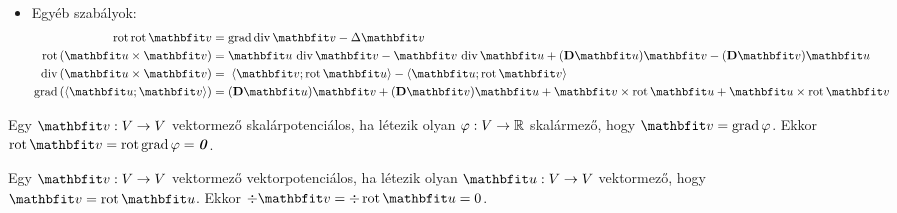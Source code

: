 \documentclass[fleqn]{szb-practice}
\begin{document}
\begin{blueBox}
\begin{itemize}
    \item Egyéb szabályok:
          \vspace{-.5em}
          \begin{align*}
            \rot \rot \rvec v
             & =\grad \Div \rvec v
            - \Delta \rvec v
            \\
            \rot \left( \rvec u \times \rvec v \right)
             & = \rvec u \, \Div \rvec v
            - \rvec v \, \Div \rvec u
            + (\DD \rvec u) \rvec v
            - (\DD \rvec v) \rvec u
            \\
            \Div \left( \rvec u \times \rvec v \right)
             & = \; \scalar{\rvec v}{\rot \rvec u}
            - \scalar{\rvec u}{\rot \rvec v}
            \\
            \grad \left( \scalar{\rvec u}{\rvec v} \right)
             & = (\DD \rvec u) \rvec v
            + (\DD \rvec v) \rvec u
            + \rvec v \times \rot \rvec u
            + \rvec u \times \rot \rvec v
          \end{align*}
  \end{itemize}
\end{blueBox}

\clearpage
\begin{blueBox}
  Egy $\rvec v: V \rightarrow V$ vektormező skalárpotenciálos, ha létezik olyan
  $\varphi: V \rightarrow \mathbb{R}$ skalármező, hogy $\rvec v = \grad \varphi$.
  Ekkor $\rot \rvec v = \rot \grad \varphi = \nvec$.

  Egy $\rvec v: V \rightarrow V$ vektormező vektorpotenciálos, ha létezik olyan
  $\rvec u: V \rightarrow V$ vektormező, hogy $\rvec v = \rot \rvec u$.
  Ekkor $\div \rvec v = \div \rot \rvec u = 0$.
\end{blueBox}
\end{document}
